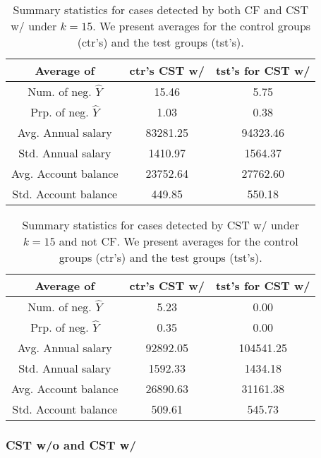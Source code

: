 %
\begin{table}[t]
\caption{Summary statistics for cases detected by both CF and CST w/ under $k=15$. We present averages for the control groups (ctr’s) and the test groups (tst’s).}
  \label{table:k-results_for_CFvsCST_InBoth}
  \centering
  \begin{tabular}{ccc}
    \toprule
    Average of & ctr's CST w/ & tst's for CST w/ \\
    \midrule
    Num. of neg. $\hat{Y}$ & 15.46 & 5.75 \\
    Prp. of neg. $\hat{Y}$ & 1.03 & 0.38 \\
    Avg. Annual salary & 83281.25 & 94323.46 \\
    Std. Annual salary & 1410.97 & 1564.37 \\
    Avg. Account balance & 23752.64 & 27762.60 \\
    Std. Account balance & 449.85 & 550.18 \\
    \bottomrule
  \end{tabular}
\end{table}
%
%
\begin{table}[t]
\caption{Summary statistics for cases detected by CST w/ under $k=15$ and not CF. We present averages for the control groups (ctr’s) and the test groups (tst’s).}
  \label{table:k-results_for_CFvsCST_InCSTOnly}
  \centering
  \begin{tabular}{ccc}
    \toprule
    Average of & ctr's CST w/ & tst's for CST w/ \\
    \midrule
    Num. of neg. $\hat{Y}$ & 5.23 & 0.00 \\
    Prp. of neg. $\hat{Y}$ & 0.35 & 0.00 \\
    Avg. Annual salary & 92892.05 & 104541.25 \\
    Std. Annual salary & 1592.33 & 1434.18 \\
    Avg. Account balance & 26890.63 & 31161.38 \\
    Std. Account balance & 509.61 & 545.73 \\
    \bottomrule
  \end{tabular}
\end{table}
%

\subsubsection{CST w/o and CST w/}
\label{sec:Experiments.IllustrativeExample.BothCST}

